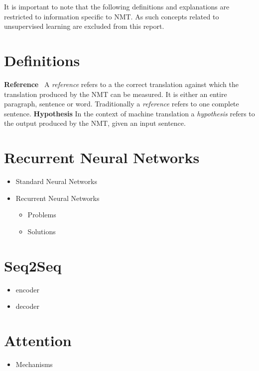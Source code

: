 \documentclass[10pt,a4paper,titlepage,twoside,english]{zhawreprt}
\begin{document}
It is important to note that the following definitions and explanations are restricted to information specific to NMT. As such concepts related to unsupervised learning are excluded from this report. 

\section{Definitions}\label{sec:Definitions}

\textbf{Reference} \quad\quad\ A \textit{reference} refers to a the correct translation against which the translation produced by the NMT can be measured. It is either an entire paragraph, sentence or word. Traditionally a \textit{reference} refers to one complete sentence. \newline
\newline
\textbf{Hypothesis} \quad\quad In the context of machine translation a \textit{hypothesis} refers to the output produced by the NMT, given an input sentence.

\section{Recurrent Neural Networks}\label{sec:Recurrent Neural Networks}
\begin{itemize}
	\item Standard Neural Networks
	\item Recurrent Neural Networks
	\begin{itemize}
		\item Problems
		\item Solutions
	\end{itemize}
\end{itemize}
\section{Seq2Seq}\label{sec:Seq2Seq}
\begin{itemize}
	\item encoder
	\item decoder
\end{itemize}
\section{Attention}\label{sec:Attention Mechanisms}
\begin{itemize}
	\item Mechanisms
\end{itemize}
\end{document}
